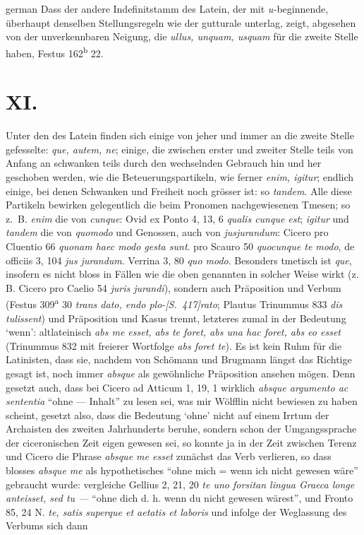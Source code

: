 \begin{otherlanguage*}{german}
Dass der andere Indefinitstamm des Latein, der mit \emph{u-}beginnende, überhaupt denselben Stellungsregeln wie der gutturale unterlag, zeigt, abgesehen von der unverkennbaren Neigung, die \emph{ullus, unquam, usquam} für die zweite Stelle haben, Festus 162\textsuperscript{b} 22.

\section*{XI.}

Unter den  des Latein finden sich einige von jeher und immer an die zweite Stelle gefesselte: \emph{que, autem, ne}; einige, die zwischen erster und zweiter Stelle teils von Anfang an schwanken teils durch den wechselnden Gebrauch hin und her geschoben werden, wie die Beteuerungspartikeln, wie ferner \emph{enim, igitur}; endlich einige, bei denen Schwanken und Freiheit noch grösser ist: so \emph{tandem}. Alle diese Partikeln bewirken gelegentlich die beim Pronomen nachgewiesenen Tmesen; so z.~B. \emph{enim} die von \emph{cunque}: Ovid ex Ponto 4, 13, 6 \emph{qualis  cunque est}; \emph{igitur} und \emph{tandem} die von \emph{quomodo} und Genossen, auch von \emph{jusjurandum}: Cicero pro Cluentio 66 \emph{quonam  haec modo gesta sunt}. pro Scauro 50 \emph{quocunque  te modo}, de officiis 3, 104 \emph{jus  jurandum}. Verrina 3, 80 \emph{quo  modo}. Besonders tmetisch ist \emph{que}, insofern es nicht bloss in Fällen wie die oben genannten in solcher Weise wirkt (z. B. Cicero pro Caelio 54 \emph{juris jurandi}), sondern auch Präposition und Verbum (Festus 309\textsuperscript{a} 30 \emph{trans dato, endo plo-}\hypertarget{p417}{\emph{[S.~417]}}\label{p417}\emph{rato}; Plautus Trinummus 833 \emph{dis tulissent}) und Präposition und Kasus trennt, letzteres zumal in der Bedeutung ‘wenn’: altlateinisch \emph{abs me esset, abs te foret, abs una hac foret, abs eo esset} (Trinummus 832 mit freierer Wortfolge \emph{abs foret te}). Es ist kein Ruhm für die Latinisten, dass sie, nachdem von Schömann und Brugmann längst das Richtige gesagt ist, noch immer \emph{absque} als gewöhnliche Präposition ansehen mögen. Denn gesetzt auch, dass bei Cicero ad Atticum 1, 19, 1 wirklich \emph{absque argumento ac sententia} “ohne — Inhalt” zu lesen sei, was mir Wölfflin nicht bewiesen zu haben scheint, gesetzt also, dass die Bedeutung ‘ohne’ nicht auf einem Irrtum der Archaisten des zweiten Jahrhunderts beruhe, sondern schon der Umgangssprache der ciceronischen Zeit eigen gewesen sei, so konnte ja in der Zeit zwischen Terenz und Cicero die Phrase \emph{absque me esset} zunächst das Verb verlieren, so dass blosses \emph{absque me} als hypothetisches “ohne mich = wenn ich nicht gewesen wäre” gebraucht wurde: vergleiche Gellius 2, 21, 20 \emph{ te uno forsitan lingua Graeca longe anteisset, sed tu —} “ohne dich d. h. wenn du nicht gewesen wärest”, und Fronto 85, 24 N. \emph{ te, satis superque et aetatis et laboris} und infolge der Weglassung des Verbums sich dann 
\end{otherlanguage*}
